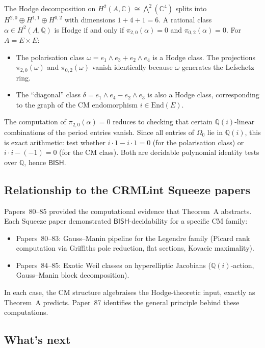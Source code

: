 \documentclass[11pt]{article}
\theoremstyle{plain}
\theoremstyle{definition}
\theoremstyle{remark}
\newcommand{\Q}{\mathbb{Q}}
\newcommand{\C}{\mathbb{C}}
\newcommand{\End}{\mathrm{End}}
\newcommand{\BISH}{\ensuremath{\mathsf{BISH}}}
\begin{document}
The Hodge decomposition on $H^2(A, \C) \cong \bigwedge^2(\C^4)$ splits into $H^{2,0} \oplus H^{1,1} \oplus H^{0,2}$ with dimensions $1 + 4 + 1 = 6$. A rational class $\alpha \in H^2(A, \Q)$ is Hodge if and only if $\pi_{2,0}(\alpha) = 0$ and $\pi_{0,2}(\alpha) = 0$. For $A = E \times E$:
\begin{itemize}
\item The polarisation class $\omega = e_1 \wedge e_3 + e_2 \wedge e_4$ is a Hodge class. The projections $\pi_{2,0}(\omega)$ and $\pi_{0,2}(\omega)$ vanish identically because $\omega$ generates the Lefschetz ring.
\item The ``diagonal'' class $\delta = e_1 \wedge e_4 - e_2 \wedge e_3$ is also a Hodge class, corresponding to the graph of the CM endomorphism $i \in \End(E)$.
\end{itemize}
The computation of $\pi_{2,0}(\alpha) = 0$ reduces to checking that certain $\Q(i)$-linear combinations of the period entries vanish. Since all entries of $\Omega_0$ lie in $\Q(i)$, this is exact arithmetic: test whether $i \cdot 1 - i \cdot 1 = 0$ (for the polarisation class) or $i \cdot i - (-1) = 0$ (for the CM class). Both are decidable polynomial identity tests over $\Q$, hence $\BISH$.

\subsection{Relationship to the CRMLint Squeeze papers}

Papers~80--85 provided the computational evidence that Theorem~A abstracts. Each Squeeze paper demonstrated $\BISH$-decidability for a specific CM family:
\begin{itemize}
\item Papers~80--83: Gauss--Manin pipeline for the Legendre family (Picard rank computation via Griffiths pole reduction, flat sections, Kovacic maximality).
\item Papers~84--85: Exotic Weil classes on hyperelliptic Jacobians ($\Q(i)$-action, Gauss--Manin block decomposition).
\end{itemize}
In each case, the CM structure algebraises the Hodge-theoretic input, exactly as Theorem~A predicts. Paper~87 identifies the general principle behind these computations.

\subsection{What's next}
\end{document}
